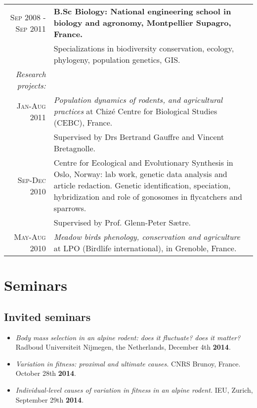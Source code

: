 \documentclass[a4paper,oneside,10pt]{article} %
\begin{document}
\begin{tabular}{r|p{11cm}}
\textsc{Sep 2008 - Sep 2011} & \textbf{B.Sc Biology: National engineering school in biology and agronomy, Montpellier Supagro, France.}\\
& \footnotesize{Specializations in biodiversity conservation, ecology, phylogeny, population genetics, GIS.}\\
\textit{Research projects:} & \\
\footnotesize{\textsc{Jan-Aug 2011}}& \emph{Population dynamics of rodents, and agricultural practices} at Chiz\'{e} Centre for Biological Studies (CEBC), France.\\ 
																		& \footnotesize{Supervised by Drs Bertrand Gauffre and Vincent Bretagnolle.} \par \\
\footnotesize{\textsc{Sep-Dec 2010}}&	Centre for Ecological and Evolutionary Synthesis in Oslo, Norway: lab work, genetic data analysis and article redaction. Genetic identification, speciation, hybridization and role of gonosomes in flycatchers and sparrows.\\
																		& \footnotesize{Supervised by Prof. Glenn-Peter S{\ae}tre.}\par \\
\footnotesize{\textsc{May-Aug 2010}}& \emph{Meadow birds phenology, conservation and agriculture} at LPO (Birdlife international), in Grenoble, France.
\end{tabular}



\section*{Seminars}
\subsection*{Invited seminars}
\begin{itemize}
\item \textit{Body mass selection in an alpine rodent: does it fluctuate? does it matter?} Radboud Universiteit Nijmegen, the Netherlands, December 4th \textbf{2014}.
\item \textit{Variation in fitness: proximal and ultimate causes.} CNRS Brunoy, France. October 28th \textbf{2014}.
\item \textit{Individual-level causes of variation in fitness in an alpine rodent.} IEU, Zurich, September 29th \textbf{2014}.
\end{itemize}
\end{document}

